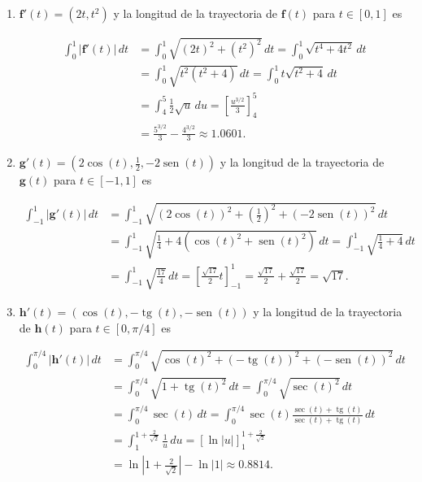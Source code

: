 \documentclass[
  spanish,
  a4paper,
]{scrreport}
\theoremstyle{definition}
\theoremstyle{remark}
\begin{document}
\begin{tcolorbox}[enhanced jigsaw, arc=.35mm, bottomrule=.15mm, bottomtitle=1mm, breakable, colback=white, colbacktitle=quarto-callout-tip-color!10!white, colframe=quarto-callout-tip-color-frame, coltitle=black, left=2mm, leftrule=.75mm, opacityback=0, opacitybacktitle=0.6, rightrule=.15mm, title=\textcolor{quarto-callout-tip-color}{\faLightbulb}\hspace{0.5em}{Solución}, titlerule=0mm, toprule=.15mm, toptitle=1mm]

\begin{enumerate}
\def\labelenumi{\alph{enumi}.}
\item
  \(\mathbf{f}'(t) = (2t, t^2)\) y la longitud de la trayectoria de
  \(\mathbf{f}(t)\) para \(t\in[0,1]\) es

  \begin{align*}
  \int_0^1 |\mathbf{f}'(t)|\,dt 
  &= \int_0^1 \sqrt{(2t)^2+(t^2)^2}\, dt
  = \int_0^1 \sqrt{t^4+4t^2}\, dt \\
  &= \int_0^1 \sqrt{t^2(t^2+4)}\, dt
  = \int_0^1 t\sqrt{t^2+4}\,dt \\
  &= \int_4^5 \frac{1}{2} \sqrt{u}\, du 
  = \left[\frac{u^{3/2}}{3}\right]_4^5 \tag{$u=t^2+4$} \\
  &= \frac{5^{3/2}}{3}-\frac{4^{3/2}}{3}
  \approx 1.0601.
  \end{align*}
\item
  \(\mathbf{g}'(t) = (2\cos(t), \frac{1}{2}, -2\operatorname{sen}(t))\)
  y la longitud de la trayectoria de \(\mathbf{g}(t)\) para
  \(t\in[-1,1]\) es

  \begin{align*}
  \int_{-1}^1 |\mathbf{g}'(t)|\,dt 
  &= \int_{-1}^1 \sqrt{(2\cos(t))^2+\left(\frac{1}{2}\right)^2+(-2\operatorname{sen}(t))^2}\, dt \\
  &= \int_{-1}^1 \sqrt{\frac{1}{4}+4(\cos(t)^2+\operatorname{sen}(t)^2)}\, dt 
  = \int_{-1}^1 \sqrt{\frac{1}{4}+4}\, dt \\
  &= \int_{-1}^1 \sqrt{\frac{17}{4}}\, dt 
  = \left[\frac{\sqrt{17}}{2}t\right]_{-1}^1
  = \frac{\sqrt{17}}{2}+\frac{\sqrt{17}}{2}
  = \sqrt{17}.
  \end{align*}
\item
  \(\mathbf{h}'(t) = (\cos(t), -\operatorname{tg}(t), -\operatorname{sen}(t))\)
  y la longitud de la trayectoria de \(\mathbf{h}(t)\) para
  \(t\in[0,\pi/4]\) es

  \begin{align*}
  \int_0^{\pi/4} |\mathbf{h}'(t)|\,dt 
  &= \int_0^{\pi/4} \sqrt{\cos(t)^2+(-\operatorname{tg}(t))^2+(-\operatorname{sen}(t))^2}\, dt \\
  &= \int_0^{\pi/4} \sqrt{1+\operatorname{tg}(t)^2}\, dt 
  = \int_0^{\pi/4} \sqrt{\sec(t)^2}\, dt \\
  &= \int_0^{\pi/4} \sec(t)\, dt 
  = \int_0^{\pi/4} \sec(t)\frac{\sec(t)+\operatorname{tg}(t)}{\sec(t)+\operatorname{tg}(t)}\, dt \\
  &= \int_{1}^{1+\frac{2}{\sqrt{2}}} \frac{1}{u}\, du 
  = [\ln|u|]_1^{1+\frac{2}{\sqrt{2}}} \tag{1}\\
  &= \ln\left|1+\frac{2}{\sqrt{2}}\right|-\ln|1|
  \approx 0.8814.
  \end{align*}


\end{enumerate}
\end{tcolorbox}
\end{document}
